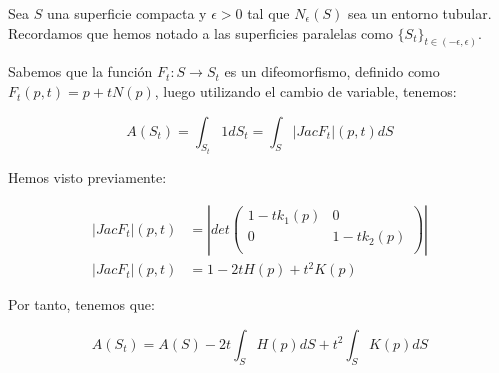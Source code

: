 \begin{remark}
Sea $S$ una superficie compacta y $\epsilon > 0$ tal que $N_\epsilon(S)$ sea un entorno tubular. Recordamos que hemos notado a las superficies paralelas como $\{S_t\}_{t \in (-\epsilon, \epsilon)}$.

Sabemos que la función $F_t: S \longrightarrow S_t$ es un difeomorfismo, definido como $F_t(p, t) = p + tN(p)$, luego utilizando el cambio de variable, tenemos:

\begin{equation*}
    A(S_t) = \int_{S_t} 1dS_t = \int_S |Jac F_t|(p,t)dS
\end{equation*}

Hemos visto previamente:

\begin{align*}
    |Jac F_t|(p,t) &= \left|
  det \left( {\begin{array}{cc}
   1 - tk_1(p) & 0 \\
   0 & 1-tk_2(p) \\
  \end{array} } \right) \right| \\
  |Jac F_t|(p,t) &= 1-2tH(p) + t^2K(p)
\end{align*}

Por tanto, tenemos que:

\begin{equation*}
    A(S_t) = A(S) -2t\int_{S} H(p)dS + t^2\int_{S} K(p)dS
\end{equation*}
\end{remark}

